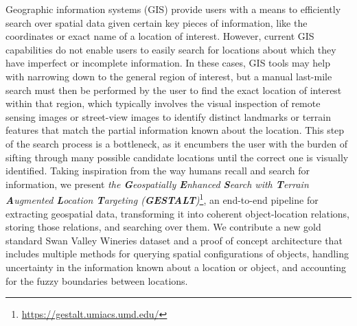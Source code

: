 

Geographic information systems (GIS) provide users with a means to efficiently search over spatial data given certain key pieces of information, like the coordinates or exact name of a location of interest. However, current GIS capabilities do not enable users to easily search for locations about which they have imperfect or incomplete information. In these cases, GIS tools may help with narrowing down to the general region of interest, but a manual last-mile search must then be performed by the user to find the exact location of interest within that region, which typically involves the visual inspection of remote sensing images or street-view images to identify distinct landmarks or terrain features that match the partial information known about the location. This step of the search process is a bottleneck, as it encumbers the user with the burden of sifting through many possible candidate locations until the correct one is visually identified. Taking inspiration from the way humans recall and search for information, we present \textit{the \textbf{G}eospatially \textbf{E}nhanced \textbf{S}earch with \textbf{T}errain \textbf{A}ugmented \textbf{L}ocation \textbf{T}argeting (\textbf{GESTALT})}\footnote{\url{https://gestalt.umiacs.umd.edu/}}, an end-to-end pipeline for extracting geospatial data, transforming it into coherent object-location relations, storing those relations, and searching over them. We contribute a new gold standard Swan Valley Wineries dataset and a proof of concept architecture that includes multiple methods for querying spatial configurations of objects, handling uncertainty in the information known about a location or object, and accounting for the fuzzy boundaries between locations.